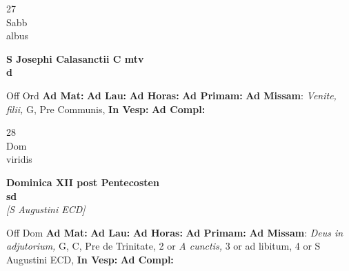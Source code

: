 \documentclass[10pt, openany]{book}
\begin{document}
        \begin{center}
            \begin{minipage}{3.5in}
                \vspace{2em}
                \begin{minipage}{0.5in}
                    {\Huge 27} \\
                    {\normalsize Sabb} \\
                    {\normalsize albus}
                \end{minipage}
                \begin{minipage}{3.0in}
                    \textbf{ \large S Josephi Calasanctii C mtv \\
                    \textnormal{\normalsize d}} \\ 
                \end{minipage}
                \begin{justify}Off Ord
                    \textbf{Ad Mat: }
                    \textbf{Ad Lau: }
                    \textbf{Ad Horas: }
                    \textbf{Ad Primam: }\textbf{Ad Missam}: \textit{Venite, filii,} G, Pre Communis,  
                    \textbf{In Vesp: }
                    \textbf{Ad Compl: }
                \end{justify}
            \end{minipage}
        \end{center}
    
        \begin{center}
            \begin{minipage}{3.5in}
                \vspace{2em}
                \begin{minipage}{0.5in}
                    {\Huge 28} \\
                    {\normalsize Dom} \\
                    {\normalsize viridis}
                \end{minipage}
                \begin{minipage}{3.0in}
                    \textbf{ \large Dominica XII post Pentecosten \\
                    \textnormal{\normalsize sd}} \\ \textit{[S Augustini ECD]} \\ 
                \end{minipage}
                \begin{justify}Off Dom
                    \textbf{Ad Mat: }
                    \textbf{Ad Lau: }
                    \textbf{Ad Horas: }
                    \textbf{Ad Primam: }\textbf{Ad Missam}: \textit{Deus in adjutorium,} G, C, Pre de Trinitate, 2 or \textit{A cunctis,} 3 or ad libitum, 4 or S Augustini ECD,  
                    \textbf{In Vesp: }
                    \textbf{Ad Compl: }
                \end{justify}
            \end{minipage}
        \end{center}
    
\end{document}
